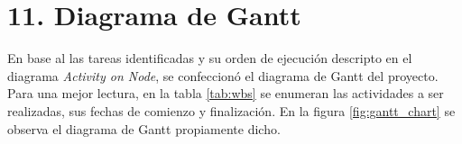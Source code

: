 \documentclass[
11pt, %
]{charter}
\begin{document}
\section{11. Diagrama de Gantt}
\label{sec:gantt}
En base al las tareas identificadas y su orden de ejecución descripto en el diagrama \textit{Activity on Node}, se confeccionó el diagrama de Gantt del proyecto. Para una mejor lectura, en la tabla \ref{tab:wbs} se enumeran las actividades a ser realizadas, sus fechas de comienzo y finalización.  En la figura \ref{fig:gantt_chart} se observa el diagrama de Gantt propiamente dicho.
%		
\end{document}
